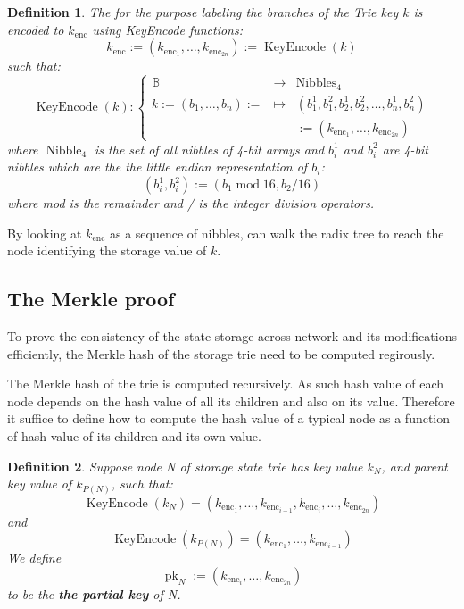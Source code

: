 \documentclass{article}
\newcommand{\assign}{:=}
\newcommand{\nosymbol}{}
\newcommand{\tmop}[1]{\ensuremath{\operatorname{#1}}}
\newcommand{\tmstrong}[1]{\textbf{#1}}
\newtheorem{definition}{Definition}
\begin{document}
\begin{definition}
  The for the purpose labeling the branches of the Trie key $k$ is encoded to
  $k_{\tmop{enc}}$ using KeyEncode functions:
  \begin{equation}
    k_{\tmop{enc}} \assign (k_{\tmop{enc}_1}, \ldots, k_{\tmop{enc}_{2 n}})
    \assign \tmop{KeyEncode} (k) \label{key-encode-in-trie}
  \end{equation}
  such that:
  \[ \tmop{KeyEncode} (k) : \left\{ \begin{array}{lll}
       \mathbb{B}^{\nosymbol} & \rightarrow & \tmop{Nibbles}_4\\
       k \assign (b_1, \ldots, b_n) \assign & \mapsto & (b^1_1, b^2_1, b_2^1,
       b^2_2, \ldots, b^1_n, b^2_n)\\
       &  & \assign (k_{\tmop{enc}_1}, \ldots, k_{\tmop{enc}_{2 n}})
     \end{array} \right. \]
  where $\tmop{Nibble}_4$ is the set of all nibbles of 4-bit arrays and
  $b^1_i$ and $b^2_i$ are 4-bit nibbles which are the the little endian
  representation of $b_i$:
  \[ (b^1_i, b^2_i) \assign (b_1 \tmop{mod} 16, b_2 / 16) \]
  where mod is the remainder and / is the integer division operators.
\end{definition}

By looking at $k_{\tmop{enc}}$ as a sequence of nibbles, can walk the radix
tree to reach the node identifying the storage value of $k$.

\subsection{The Merkle proof}

To prove the con\,sistency of the state storage across network and its
modifications efficiently, the Merkle hash of the storage trie need to be
computed regirously.

The Merkle hash of the trie is computed recursively. As such hash value of
each node depends on the hash value of all its children and also on its value.
Therefore it suffice to define how to compute the hash value of a typical node
as a function of hash value of its children and its own value.

\begin{definition}
  Suppose node N of storage state trie has key value $k_N$, and parent key
  value of $k_{P (N)}$, such that:
  \[ \tmop{KeyEncode} (k_N) = (k_{\tmop{enc}_1}, \ldots, k_{\tmop{enc}_{i -
     1}}, k_{\tmop{enc}_i}, \ldots, k_{\tmop{enc}_{2 n}}) \]
  and
  \[ \tmop{KeyEncode} (k_{P (N)}) = (k_{\tmop{enc}_1}, \ldots,
     k_{\tmop{enc}_{i - 1}}) \]
  We define
  \[ \tmop{pk}_N \assign (k_{\tmop{enc}_i}, \ldots, k_{\tmop{enc}_{2 n}}) \]
  to be the {\tmstrong{the partial key}} of N.
\end{definition}
\end{document}
